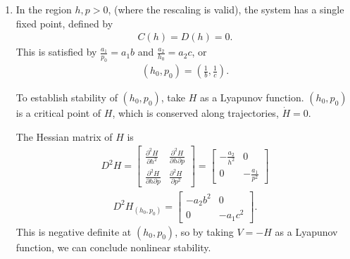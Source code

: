 \begin{solution}[8.7]
\begin{enumerate}
\item In the region $h,p>0$, (where the rescaling is valid), the system has a single fixed point, defined by 
\begin{align}
C(h) = D(h) = 0. 
\end{align}
This is satisfied by $\frac{a_1}{p_0} = a_1b$ and $\frac{a_2}{h_0} = a_2c$, or 
\begin{align}
(h_0, p_0) = \left(\frac{1}{b}, \frac{1}{c} \right).
\end{align}

To establish stability of $(h_0, p_0)$, take $H$ as a Lyapunov function. $(h_0, p_0)$ is a critical point of $H$, which is conserved along trajectories, $\dot{H}=0$. 

The Hessian matrix of $H$ is
\begin{align}
D^2H = \begin{bmatrix}\frac{\partial^2 H}{\partial h^2} &  \frac{\partial^2 H}{\partial h\partial p} \\
\frac{\partial^2 H}{\partial h\partial p} & \frac{\partial^2 H}{\partial p^2}\end{bmatrix} = \begin{bmatrix} -\frac{a_2}{h^2} & 0 \\ 0 & -\frac{a_1}{p^2} \end{bmatrix} 
\end{align}
\begin{align}
D^2 H_{(h_0,p_0)} = \begin{bmatrix}-a_2b^2 & 0 \\ 0 & -a_1c^2\end{bmatrix}.
\end{align}
This is negative definite at $(h_0, p_0)$, so by taking $V=-H$ as a Lyapunov function, we can conclude nonlinear stability. 
\end{enumerate}


\end{solution}
